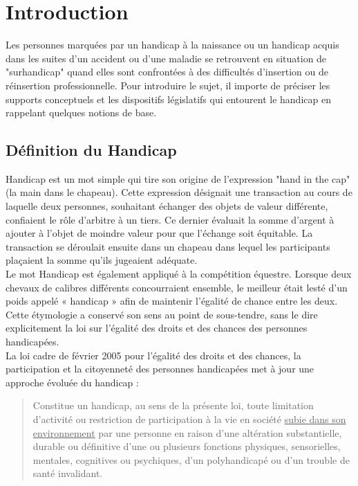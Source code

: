 \chapter{Introduction}

Les personnes marquées par un handicap à la naissance ou un handicap acquis dans les suites d'un accident ou d'une maladie se retrouvent en situation de "surhandicap" quand elles sont confrontées à des difficultés d'insertion ou de réinsertion professionnelle. Pour introduire le sujet, il importe de préciser les supports conceptuels et les dispositifs législatifs qui entourent le handicap en rappelant quelques notions de base.

\section{Définition du Handicap}
Handicap est un mot simple qui tire son origine de l'expression "hand in the cap" (la main dans le chapeau). Cette expression désignait une transaction au cours de laquelle deux personnes, souhaitant échanger des objets de valeur différente, confiaient le r\^ole d'arbitre à un tiers. Ce dernier évaluait la somme d'argent à ajouter à l'objet de moindre valeur pour que l'échange soit équitable. La transaction se déroulait ensuite dans un chapeau dans lequel les participants plaçaient la somme qu'ils jugeaient adéquate.\\

Le mot Handicap est également appliqué à la compétition équestre. Lorsque deux chevaux de calibres différents concourraient ensemble, le meilleur était lesté d’un poids appelé « handicap » afin de maintenir l’égalité de chance entre les deux.\\
Cette étymologie a conservé son sens au point de sous-tendre, sans le dire explicitement la loi sur l'égalité des droits et des chances des personnes handicapées.\\

\noindent La loi cadre de février 2005 pour l'égalité des droits et des chances, la participation et la citoyenneté des personnes handicapées met à jour une approche évoluée du handicap :

\begin{quotation}
\noindent Constitue un handicap, au sens de la présente loi, toute limitation d’activité ou restriction de participation à la vie en société \underline{subie dans son environnement} par une personne en raison d’une altération substantielle, durable ou définitive d’une ou plusieurs fonctions physiques, sensorielles, mentales, cognitives ou psychiques, d’un polyhandicapé ou d’un trouble de santé invalidant.\\
\end{quotation}


